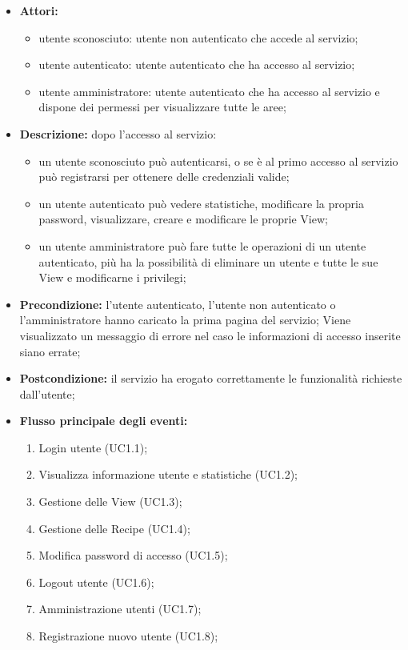 \begin{itemize}
    \item \textbf{Attori:}
    \begin{itemize}
    	\item utente sconosciuto: utente non autenticato che accede al servizio;
    	\item utente autenticato: utente autenticato che ha accesso al servizio;
    	\item utente amministratore: utente autenticato che ha accesso al servizio e dispone dei permessi per visualizzare tutte le aree;
	\end{itemize}
    \item \textbf{Descrizione:} dopo l'accesso al servizio:
    \begin{itemize}
    	\item un utente sconosciuto può autenticarsi, o se è al primo accesso al servizio può registrarsi per ottenere delle credenziali valide;
    	\item un utente autenticato può vedere statistiche, modificare la propria password, visualizzare, creare e modificare le proprie View\gloss{};
  		\item un utente amministratore può fare tutte le operazioni di un utente autenticato, più ha la possibilità di eliminare un utente e tutte le sue View\gloss{} e modificarne i privilegi;
	\end{itemize}
    \item \textbf{Precondizione:} l'utente autenticato, l'utente non autenticato o l'amministratore hanno caricato la prima pagina del servizio;
    Viene visualizzato un messaggio di errore nel caso le informazioni di accesso inserite siano errate;
    \item \textbf{Postcondizione:} il servizio ha erogato correttamente le funzionalità richieste dall'utente;
    \item \textbf{Flusso principale degli eventi:}
    	\begin{enumerate}
    		\item Login utente (UC1.1);
    		\item Visualizza informazione utente e statistiche (UC1.2);
    		\item Gestione delle View\gloss{} (UC1.3);
    		\item Gestione delle Recipe\gloss{} (UC1.4);
    		\item Modifica password di accesso (UC1.5);
    		\item Logout utente (UC1.6);
    		\item Amministrazione utenti (UC1.7);
    		\item Registrazione nuovo utente (UC1.8);
    	\end{enumerate}
\end{itemize}

